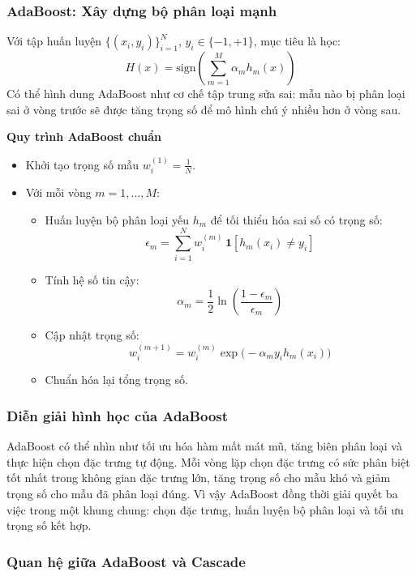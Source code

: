 \subsubsection{AdaBoost: Xây dựng bộ phân loại mạnh}

Với tập huấn luyện $\{(x_i,y_i)\}_{i=1}^{N}$, $y_i \in \{-1,+1\}$, mục tiêu là học:
\[
H(x)=\mathrm{sign}\!\left(\sum_{m=1}^{M}\alpha_m h_m(x)\right)
\]
Có thể hình dung AdaBoost như cơ chế tập trung sửa sai: mẫu nào bị phân loại sai ở vòng trước sẽ được tăng trọng số để mô hình chú ý nhiều hơn ở vòng sau.

\noindent\textbf{Quy trình AdaBoost chuẩn}
\begin{itemize}
  \item Khởi tạo trọng số mẫu $w_i^{(1)}=\frac{1}{N}$.
  \item Với mỗi vòng $m=1,\ldots,M$:
  \begin{itemize}
    \item Huấn luyện bộ phân loại yếu $h_m$ để tối thiểu hóa sai số có trọng số:
    \[
    \epsilon_m=\sum_{i=1}^{N} w_i^{(m)}\,\mathbf{1}[h_m(x_i)\neq y_i]
    \]
    \item Tính hệ số tin cậy:
    \[
    \alpha_m=\frac{1}{2}\ln\!\left(\frac{1-\epsilon_m}{\epsilon_m}\right)
    \]
    \item Cập nhật trọng số:
    \[
    w_i^{(m+1)}=w_i^{(m)}\exp\!\big(-\alpha_m y_i h_m(x_i)\big)
    \]
    \item Chuẩn hóa lại tổng trọng số.
  \end{itemize}
\end{itemize}

\subsubsection{Diễn giải hình học của AdaBoost}

AdaBoost có thể nhìn như tối ưu hóa hàm mất mát mũ, tăng biên phân loại và thực hiện chọn đặc trưng tự động.
Mỗi vòng lặp chọn đặc trưng có sức phân biệt tốt nhất trong không gian đặc trưng lớn, tăng trọng số cho mẫu khó và giảm trọng số cho mẫu đã phân loại đúng.
Vì vậy AdaBoost đồng thời giải quyết ba việc trong một khung chung: chọn đặc trưng, huấn luyện bộ phân loại và tối ưu trọng số kết hợp.

\subsubsection{Quan hệ giữa AdaBoost và Cascade}

